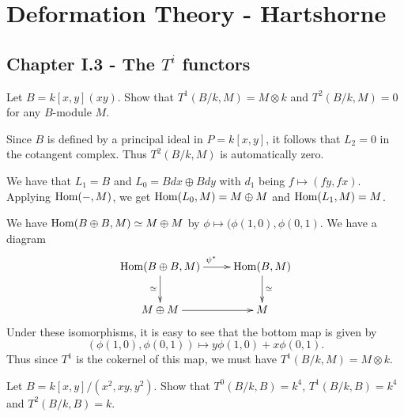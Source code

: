 \documentclass[11pt, english]{article}
\begin{document}
\section{Deformation Theory - Hartshorne}

\subsection{Chapter I.3 - The $T^i$ functors}

\begin{exc}[Exercise 3.1]
Let $B=k[x,y](xy)$. Show that $T^1(B/k,M)=M \otimes k$ and $T^2(B/k,M)=0$ for any $B$-module $M$.  
\end{exc}
\begin{sol}
Since $B$ is defined by a principal ideal in $P=k[x,y]$, it follows that $L_2=0$ in the cotangent complex. Thus $T^2(B/k,M)$ is automatically zero.

We have that $L_1 = B$ and $L_0 = B dx \oplus B dy$ with $d_1$ being $f \mapsto (fy,fx)$. Applying $\operatorname{Hom}(-,M)$, we get $\operatorname{Hom}(L_0,M)=M \oplus M$ and $\operatorname{Hom}(L_1,M)=M$.

We have $\operatorname{Hom}(B \oplus B,M) \simeq M \oplus M$ by $\phi \mapsto (\phi(1,0),\phi(0,1)$. We have a diagram
\[
\xymatrix{
\Hom(B \oplus B, M) \ar[d]_{\simeq} \ar[r]^{\psi^\ast} & \Hom(B,M) \ar[d]^{\simeq} \\
M \oplus M  \ar[r] & M
}
\]
Under these isomorphisms, it is easy to see that the bottom map is given by
\[
(\phi(1,0),\phi(0,1)) \mapsto y \phi(1,0) + x\phi(0,1).
\]
Thus since $T^1$ is the cokernel of this map, we must have $T^1(B/k,M) = M \otimes k$. 
\end{sol}

\begin{exc}[Exercise 3.3]
Let $B = k[x,y]/(x^2,xy,y^2)$. Show that $T^0(B/k,B) = k^4$, $T^1(B/k,B)=k^4$ and $T^2(B/k,B)=k$.  
\end{exc}
\end{document}

